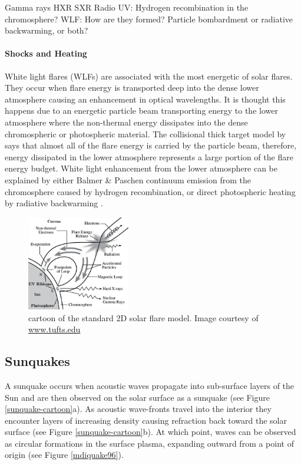 Gamma rays
HXR 
SXR
Radio
UV:
    Hydrogen recombination in the chromosphere?
WLF: 
    How are they formed? Particle bombardment or radiative backwarming, or both?
\paragraph{Shocks and Heating}



White light flares (WLFs) are associated with the most energetic of solar flares. They occur when flare energy is transported deep into the dense lower atmosphere causing an enhancement in optical wavelengths. It is thought this happens due to an energetic particle beam transporting energy to the lower atmosphere where the non-thermal energy dissipates into the dense chromospheric or photospheric material. The collisional thick target model by \cite{1971SoPh...18..489B} says that almost all of the flare energy is carried by the particle beam, therefore, energy dissipated in the lower atmosphere represents a large portion of the flare energy budget. White light enhancement from the lower atmosphere can be explained by either Balmer \& Paschen continuum emission from the chromosphere caused by hydrogen recombination, or direct photospheric heating \citep{2007ASPC..368..417D} by radiative backwarming \citep{1989SoPh..124..303M}.


\begin{figure}[H]
  \begin{center}
  \includegraphics[width=0.40\textwidth]{flare}
  \caption{cartoon of the standard 2D solar flare model. Image courtesy of \href{http://ase.tufts.edu/cosmos/print_images.asp?id=47}{www.tufts.edu}}\label{flare-cartoon}
\end{center}
\end{figure}


 



\subsection{Sunquakes}
A sunquake occurs when acoustic waves propagate into sub-surface layers of the Sun 
and are then observed on the solar surface as a sunquake (see Figure \ref{sunquake-cartoon}a). As acoustic wave-fronts travel into the interior they encounter layers of increasing density causing refraction back toward the solar surface (see Figure \ref{sunquake-cartoon}b). At which point, waves can be observed as circular formations in the surface plasma, expanding outward from a point of origin (see Figure \ref{mdiquake96}).


